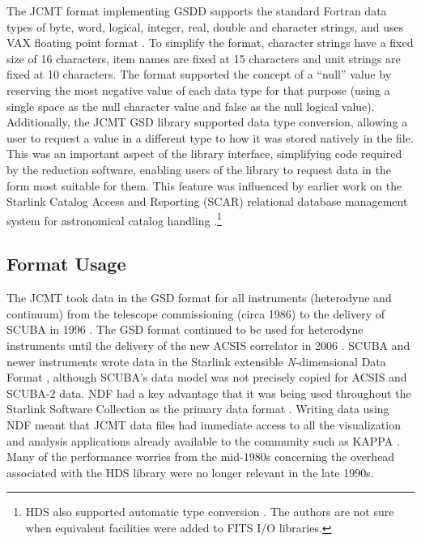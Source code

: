 \documentclass[final,authoryear,5p,times,twocolumn]{elsarticle}
\newcommand{\ascl}[1]{\href{http://www.ascl.net/#1}{ascl:#1}}
\begin{document}
The JCMT format implementing GSDD supports the standard Fortran data
types of byte, word, logical, integer, real, double and character
strings, and uses VAX floating point format \citep[see][for more
information on VAX floating point
format]{Payne:1980:VFP:641845.641849}. To simplify the format,
character strings have a fixed size of 16 characters, item names are
fixed at 15 characters and unit strings are fixed at 10
characters. The format supported the concept of a ``null'' value by
reserving the most negative value of each data type for that purpose
(using a single space as the null character value and false as the
null logical value). Additionally, the JCMT GSD library supported data
type conversion, allowing a user to request a value in a different
type to how it was stored natively in the file. This was an important
aspect of the library interface, simplifying code required by the
reduction software, enabling users of the library to request data in
the form most suitable for them. This feature was influenced by
earlier work on the Starlink Catalog Access and Reporting (SCAR)
relational database management system for astronomical catalog
handling \citep{SUN70}.\footnote{HDS also supported automatic type
  conversion \citep{SSN27}. The authors are not sure when equivalent
  facilities were added to FITS I/O libraries.}

\subsection{Format Usage}

The JCMT took data in the GSD format for all instruments (heterodyne
and continuum) from the telescope commissioning (circa 1986) to the
delivery of SCUBA in 1996 \citep{1999MNRAS.303..659H}. The GSD format
continued to be used for heterodyne instruments until the delivery of
the new ACSIS correlator in 2006 \citep{2009MNRAS.399.1026B}.  SCUBA
and newer instruments wrote data in the Starlink extensible
\emph{N}-dimensional Data Format \citep[NDF;][]{2015NDF}, although
SCUBA's data model was not precisely copied for ACSIS and
SCUBA-2 \citep{2013MNRAS.430.2513H} data. NDF had a key advantage that
it was being used throughout the Starlink Software Collection as the
primary data format \citep{1992ASPC...25..126A}. Writing data using
NDF meant that JCMT data files had immediate access to all the
visualization and analysis applications already available to the
community such as KAPPA \citep[][\ascl{1403.022}]{SUN95}. Many of the
performance worries from the mid-1980s concerning the overhead
associated with the HDS library were no longer relevant in the late 1990s.
\end{document}
